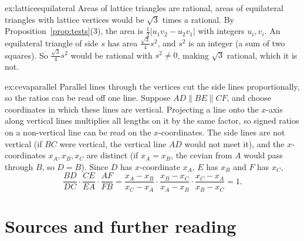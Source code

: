 \begin{solution}{ex:latticeequilateral}
\idea Areas of lattice triangles are rational, areas of equilateral triangles with lattice vertices would be $\sqrt3$ times a rational.
\writeup By Proposition~\ref{prop:tests}(3), the area is $\frac12|u_1v_2-u_2v_1|$ with integers $u_i,v_i$. An equilateral triangle of side $s$ has
area $\frac{\sqrt3}4s^2$, and $s^2$ is an integer (a sum of two squares). So $\frac{\sqrt3}4s^2$ would be rational with $s^2\ne0$, making $\sqrt3$
rational, which it is not.
\end{solution}

\begin{solution}{ex:cevaparallel}
\idea Parallel lines through the vertices cut the side lines proportionally, so the ratios can be read off one line.
\writeup Suppose $AD\parallel BE\parallel CF$, and choose coordinates in which these lines are vertical. Projecting a line onto the $x$-axis
along vertical lines multiplies all lengths on it by the same factor, so signed ratios on a non-vertical line can be read on the
$x$-coordinates. The side lines are not vertical (if $BC$ were vertical, the vertical line $AD$ would not meet it), and the
$x$-coordinates $x_A,x_B,x_C$ are distinct (if $x_A=x_B$, the cevian from $A$ would pass through $B$, so $D=B$). Since $D$ has
$x$-coordinate $x_A$, $E$ has $x_B$ and $F$ has $x_C$,
\[
\frac{BD}{DC}\cdot\frac{CE}{EA}\cdot\frac{AF}{FB}=\frac{x_A-x_B}{x_C-x_A}\cdot\frac{x_B-x_C}{x_A-x_B}\cdot\frac{x_C-x_A}{x_B-x_C}=1.
\]
\end{solution}

\section*{Sources and further reading}

